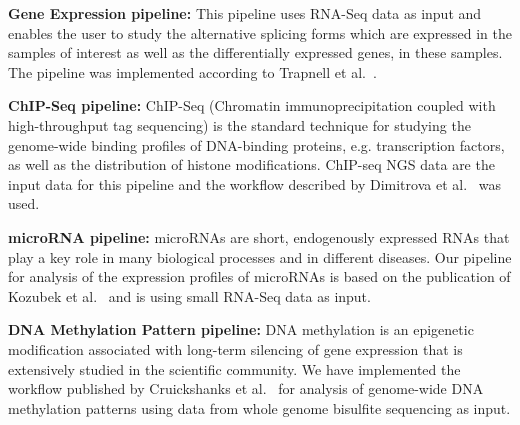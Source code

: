 \textbf{Gene Expression pipeline:} This pipeline uses RNA-Seq data as input and enables the user to study the alternative splicing forms which are expressed in the samples of interest as well as the differentially expressed genes, in these samples. The pipeline was implemented according to Trapnell et al.~\cite{trapnell2012differential, trapnell2013differential}.

\textbf{ChIP-Seq pipeline:} ChIP-Seq (Chromatin immunoprecipitation coupled with high-throughput tag sequencing) is the standard technique for studying the genome-wide binding profiles of DNA-binding proteins, e.g. transcription factors, as well as the distribution of histone modifications. ChIP-seq NGS data are the input data for this pipeline and the workflow described by Dimitrova et al.~\cite{dimitrova2014pax5} was used.

\textbf{microRNA pipeline:} microRNAs are short, endogenously expressed RNAs that play a key role in many biological processes and in different diseases. Our pipeline for analysis of the expression profiles of microRNAs is based on the publication of Kozubek et al.~\cite{kozubek2013depth} and is using small RNA-Seq data as input.

\textbf{DNA Methylation Pattern pipeline:} DNA methylation is an epigenetic modification associated with long-term silencing of gene expression that is extensively studied in the scientific community. We have implemented the workflow published by Cruickshanks et al.~\cite{cruickshanks2013senescent} for analysis of genome-wide DNA methylation patterns using data from whole genome bisulfite sequencing as input.



